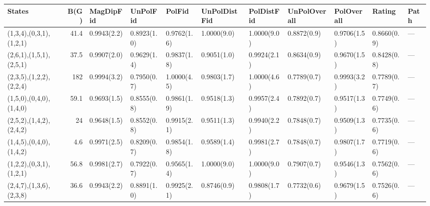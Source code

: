 \begin{tabular}{lrlllllllll}
\hline
 States                  &   B(G) & MagDipFid   & UnPolFid    & PolFid      & UnPolDistFid   & PolDistFid   & UnPolOverall   & PolOverall   & Rating      & Path   \\
\hline
 (1,3,4),(0,3,1),(1,2,1) &   41.4 & 0.9943(2.2) & 0.8923(1.0) & 0.9762(1.6) & 1.0000(9.0)    & 1.0000(9.0)  & 0.8872(0.9)    & 0.9706(1.5)  & 0.8660(0.9) & ---    \\
 (2,6,1),(1,5,1),(2,5,1) &   37.5 & 0.9907(2.0) & 0.9629(1.4) & 0.9837(1.8) & 0.9051(1.0)    & 0.9924(2.1)  & 0.8634(0.9)    & 0.9670(1.5)  & 0.8428(0.8) & ---    \\
 (2,3,5),(1,2,2),(2,2,4) &  182   & 0.9994(3.2) & 0.7950(0.7) & 1.0000(4.5) & 0.9803(1.7)    & 1.0000(4.6)  & 0.7789(0.7)    & 0.9993(3.2)  & 0.7789(0.7) & ---    \\
 (1,5,0),(0,4,0),(1,4,0) &   59.1 & 0.9693(1.5) & 0.8555(0.8) & 0.9861(1.9) & 0.9518(1.3)    & 0.9957(2.4)  & 0.7892(0.7)    & 0.9517(1.3)  & 0.7749(0.6) & ---    \\
 (2,5,2),(1,4,2),(2,4,2) &   24   & 0.9648(1.5) & 0.8552(0.8) & 0.9915(2.1) & 0.9511(1.3)    & 0.9940(2.2)  & 0.7848(0.7)    & 0.9509(1.3)  & 0.7735(0.6) & ---    \\
 (1,4,5),(0,4,0),(1,4,2) &    4.6 & 0.9971(2.5) & 0.8209(0.7) & 0.9854(1.8) & 0.9589(1.4)    & 0.9981(2.7)  & 0.7848(0.7)    & 0.9807(1.7)  & 0.7719(0.6) & ---    \\
 (1,2,2),(0,3,1),(1,2,1) &   56.8 & 0.9981(2.7) & 0.7922(0.7) & 0.9565(1.4) & 1.0000(9.0)    & 1.0000(9.0)  & 0.7907(0.7)    & 0.9546(1.3)  & 0.7562(0.6) & ---    \\
 (2,4,7),(1,3,6),(2,3,8) &   36.6 & 0.9943(2.2) & 0.8891(1.0) & 0.9925(2.1) & 0.8746(0.9)    & 0.9808(1.7)  & 0.7732(0.6)    & 0.9679(1.5)  & 0.7526(0.6) & ---    \\
\hline
\end{tabular}